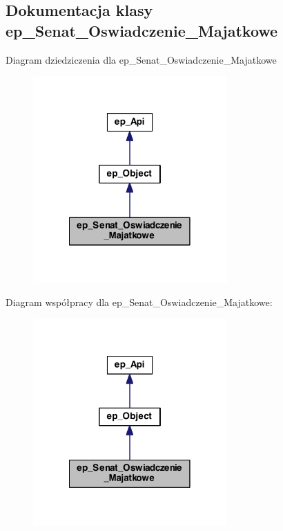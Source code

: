 \hypertarget{classep___senat___oswiadczenie___majatkowe}{\subsection{Dokumentacja klasy ep\-\_\-\-Senat\-\_\-\-Oswiadczenie\-\_\-\-Majatkowe}
\label{classep___senat___oswiadczenie___majatkowe}
}


Diagram dziedziczenia dla ep\-\_\-\-Senat\-\_\-\-Oswiadczenie\-\_\-\-Majatkowe\nopagebreak
\begin{figure}[H]
\begin{center}
\leavevmode
\includegraphics[width=210pt]{classep___senat___oswiadczenie___majatkowe__inherit__graph}
\end{center}
\end{figure}


Diagram współpracy dla ep\-\_\-\-Senat\-\_\-\-Oswiadczenie\-\_\-\-Majatkowe\-:\nopagebreak
\begin{figure}[H]
\begin{center}
\leavevmode
\includegraphics[width=210pt]{classep___senat___oswiadczenie___majatkowe__coll__graph}
\end{center}
\end{figure}
